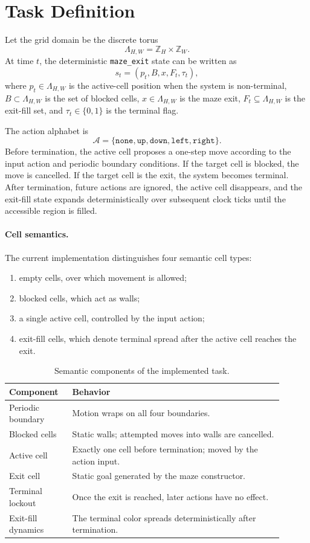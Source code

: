 \documentclass[11pt]{article}
\begin{document}
\section{Task Definition}
Let the grid domain be the discrete torus
\[
\Lambda_{H,W} = \mathbb{Z}_H \times \mathbb{Z}_W.
\]
At time \(t\), the deterministic \texttt{maze\_exit} state can be written as
\[
s_t = (p_t, B, x, F_t, \tau_t),
\]
where \(p_t \in \Lambda_{H,W}\) is the active-cell position when the system is non-terminal, \(B \subset \Lambda_{H,W}\) is the set of blocked cells, \(x \in \Lambda_{H,W}\) is the maze exit, \(F_t \subseteq \Lambda_{H,W}\) is the exit-fill set, and \(\tau_t \in \{0,1\}\) is the terminal flag.

The action alphabet is
\[
\mathcal{A} = \{\texttt{none}, \texttt{up}, \texttt{down}, \texttt{left}, \texttt{right}\}.
\]
Before termination, the active cell proposes a one-step move according to the input action and periodic boundary conditions. If the target cell is blocked, the move is cancelled. If the target cell is the exit, the system becomes terminal. After termination, future actions are ignored, the active cell disappears, and the exit-fill state expands deterministically over subsequent clock ticks until the accessible region is filled.

\paragraph{Cell semantics.}
The current implementation distinguishes four semantic cell types:
\begin{enumerate}
  \item empty cells, over which movement is allowed;
  \item blocked cells, which act as walls;
  \item a single active cell, controlled by the input action;
  \item exit-fill cells, which denote terminal spread after the active cell reaches the exit.
\end{enumerate}

\begin{table}[t]
\centering
\caption{Semantic components of the implemented task.}
\begin{tabular}{>{\raggedright\arraybackslash}p{0.20\linewidth} >{\raggedright\arraybackslash}p{0.70\linewidth}}
\toprule
Component & Behavior \\
\midrule
Periodic boundary & Motion wraps on all four boundaries. \\
Blocked cells & Static walls; attempted moves into walls are cancelled. \\
Active cell & Exactly one cell before termination; moved by the action input. \\
Exit cell & Static goal generated by the maze constructor. \\
Terminal lockout & Once the exit is reached, later actions have no effect. \\
Exit-fill dynamics & The terminal color spreads deterministically after termination. \\
\bottomrule
\end{tabular}
\end{table}
\end{document}
